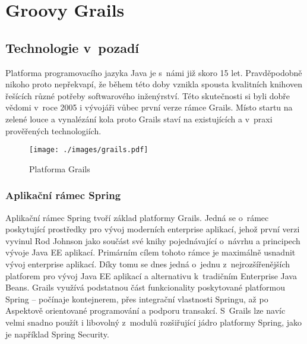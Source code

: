 \chapter{Groovy Grails}

\section{Technologie v~pozadí}
Platforma programovacího jazyka Java je s~námi  již skoro 15 let. Pravděpodobně nikoho proto nepřekvapí, že během této doby vznikla spousta kvalitních knihoven řešících různé potřeby softwarového inženýrství. Této skutečnosti si byli dobře vědomi v~roce 2005 i vývojáři vůbec první verze rámce Grails. Místo startu na zelené louce a vynalézání kola proto Grails staví na existujících a v~praxi prověřených technologiích\cite{grails-in-action}.
\begin{figure}[h]
    \centering
    \texttt{[image: ./images/grails.pdf]}
    \caption{Platforma Grails}
\end{figure}
\subsection{Aplikační rámec Spring}
Aplikační rámec Spring tvoří základ platformy Grails. Jedná se o~rámec poskytující prostředky pro vývoj moderních enterprise aplikací, jehož první verzi vyvinul Rod Johnson jako součást své knihy  pojednávající o~návrhu a principech vývoje Java EE aplikací. Primárním cílem tohoto rámce je maximálně usnadnit vývoj enterprise aplikací. Díky tomu se dnes jedná o~jednu z~nejrozšířenějších platforem pro vývoj Java EE aplikací a alternativu k~tradičním Enterprise Java Beans\cite{spring-homepage}. Grails využívá podstatnou část funkcionality poskytované platformou Spring -- počínaje  kontejnerem, přes integrační vlastnosti Springu, až po Aspektově orientované programování a podporu transakcí. S~Grails lze navíc velmi snadno použít i libovolný z~modulů rozšiřující jádro platformy Spring, jako je například Spring Security.


